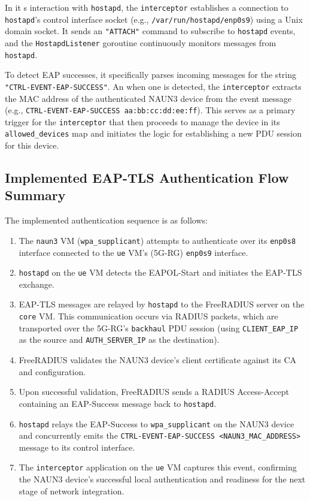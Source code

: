 In it s interaction with \texttt{hostapd}, the \texttt{interceptor} establishes a connection to \texttt{hostapd}'s control interface socket (e.g., \texttt{/var/run/hostapd/enp0s9}) using a Unix domain socket. It sends an \texttt{"ATTACH"} command to subscribe to \texttt{hostapd} events, and the \texttt{HostapdListener} goroutine continuously monitors messages from \texttt{hostapd}.

To detect \ac{EAP} successes, it specifically parses incoming messages for the string \texttt{"CTRL-EVENT-EAP-SUCCESS"}. An when one is detected,  the \texttt{interceptor} extracts the \ac{MAC} address of the authenticated \ac{NAUN3} device from the event message (e.g., \texttt{CTRL-EVENT-EAP-SUCCESS aa:bb:cc:dd:ee:ff}). This serves as a primary trigger for the \texttt{interceptor} that then proceeds to manage the device in its \texttt{allowed\_devices} map and initiates the logic for establishing a new \ac{PDU} session for this device.

\subsection{Implemented \ac{EAP-TLS} Authentication Flow Summary}

The implemented authentication sequence is as follows:

\begin{enumerate}
    \item The \texttt{naun3} \ac{VM} (\texttt{wpa\_supplicant}) attempts to authenticate over its \texttt{enp0s8} interface connected to the \texttt{ue} \ac{VM}'s (\ac{5G-RG}) \texttt{enp0s9} interface.
    \item \texttt{hostapd} on the \texttt{ue} \ac{VM} detects the \ac{EAPOL}-Start and initiates the \ac{EAP-TLS} exchange.
    \item \ac{EAP-TLS} messages are relayed by \texttt{hostapd} to the FreeRADIUS server on the \texttt{core} \ac{VM}. This communication occurs via \ac{RADIUS} packets, which are transported over the \ac{5G-RG}'s \texttt{backhaul} \ac{PDU} session (using \texttt{CLIENT\_EAP\_IP} as the source and \texttt{AUTH\_SERVER\_IP} as the destination).
    \item FreeRADIUS validates the \ac{NAUN3} device's client certificate against its \ac{CA} and configuration.
    \item Upon successful validation, FreeRADIUS sends a \ac{RADIUS} Access-Accept containing an \ac{EAP}-Success message back to \texttt{hostapd}.
    \item \texttt{hostapd} relays the \ac{EAP}-Success to \texttt{wpa\_supplicant} on the \ac{NAUN3} device and concurrently emits the \texttt{CTRL-EVENT-EAP-SUCCESS <NAUN3\_MAC\_ADDRESS>} message to its control interface.
    \item The \texttt{interceptor} application on the \texttt{ue} \ac{VM} captures this event, confirming the \ac{NAUN3} device's successful local authentication and readiness for the next stage of network integration.
\end{enumerate}

